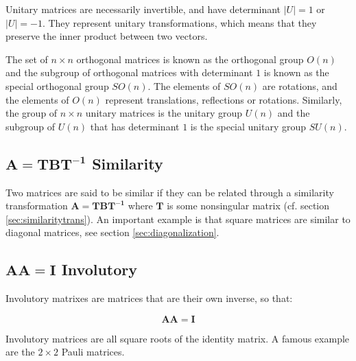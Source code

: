 Unitary matrices are necessarily invertible, and have determinant $|U|=1$ or $|U|=-1$. They represent unitary transformations, which means that they preserve the inner product between two vectors.

The set of $n \times n$ orthogonal matrices is known as the orthogonal group $O(n)$ and the subgroup of orthogonal matrices with determinant $1$ is known as the special orthogonal group $SO(n)$. The elements of $SO(n)$ are rotations, and the elements of $O(n)$ represent translations, reflections or rotations. Similarly, the group of $n \times n$ unitary matrices is the unitary group $U(n)$ and the subgroup of $U(n)$ that has determinant $1$ is the special unitary group $SU(n)$.



\subsection{$\mathbf{A} = \mathbf{TBT^{-1}}$ Similarity}
Two matrices are said to be similar if they can be related through a similarity transformation  $\mathbf{A} = \mathbf{TBT^{-1}}$ where $\mathbf{T}$ is some nonsingular matrix (cf. section \ref{sec:similaritytrans}). An important example is that square matrices are similar to diagonal matrices, see section \ref{sec:diagonalization}. 
   


\subsection{$\mathbf{A}\mathbf{A}=\mathbf{I}$ Involutory}
Involutory matrixes are matrices that are their own inverse, so that:

\begin{equation}
\mathbf{A}\mathbf{A}=\mathbf{I}
\end{equation}

Involutory matrices are all square roots of the identity matrix. A famous example are the $2\times 2$ Pauli matrices. 